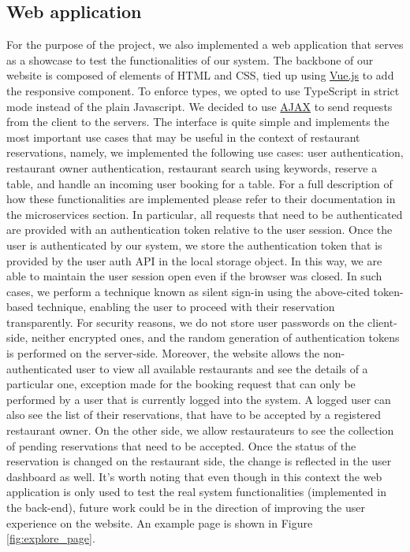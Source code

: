 \subsection{Web application}
For the purpose of the project, we also implemented a web application that serves
as a showcase to test the functionalities of our system. The backbone of our website
is composed of elements of HTML and CSS, tied up using \href{https://vuejs.org/}{Vue.js}
to add the responsive component. To enforce types, we opted to use TypeScript
in strict mode instead of the plain Javascript. We decided to use
\href{https://en.wikipedia.org/wiki/Ajax_(programming)}{AJAX} to send requests from the client to the servers. The interface is quite simple and implements the most important use cases that may be useful in the context of restaurant reservations, namely, we implemented the following use cases: user authentication, restaurant owner authentication, restaurant search using keywords, reserve a table, and handle an incoming user booking for a table. For a full description of how these functionalities are implemented please refer to their documentation in the microservices section. In particular, all requests that need to be authenticated are provided with an authentication token relative to the user session. Once the user is authenticated by our system, we store the authentication token that is provided by the user auth API in the local storage object. In this way, we are able to maintain the user session open even if the browser was closed. In such cases, we perform a technique known as silent sign-in using the above-cited token-based technique, enabling the user to proceed with their reservation transparently. For security reasons, we do not store user passwords on the client-side, neither encrypted ones, and the random generation of authentication tokens is performed on the server-side. Moreover, the website allows the non-authenticated user to view all available restaurants and see the details of a particular one, exception made for the booking request that can only be performed by a user that is currently logged into the system. A logged user can also see the list of their reservations, that have to be accepted by a registered restaurant owner. On the other side, we allow restaurateurs to see the collection of pending reservations that need to be accepted. Once the status of the reservation is changed on the restaurant side, the change is reflected in the user dashboard as well. It's worth noting that even though in this context the web application is only used to test the real system functionalities (implemented in the back-end), future work could be in the direction of improving the user experience on the website.
An example page is shown in Figure \ref{fig:explore_page}.

